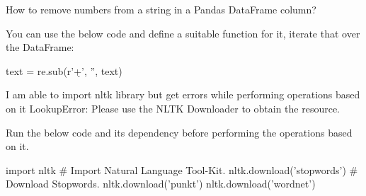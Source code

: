 	\begin{qanda}
		\begin{question}
How to remove numbers from a string in a Pandas DataFrame column?
		\end{question}
		\begin{answer}
You can use the below code and define a suitable function for it, iterate that over the DataFrame:

text = re.sub(r'\d+', '', text)
		\end{answer}
	\end{qanda}

	\begin{qanda}
		\begin{question}
I am able to import nltk library but get errors while performing operations based on it LookupError: Please use the NLTK Downloader to obtain the resource.
		\end{question}
		\begin{answer}
Run the below code and its dependency before performing the operations based on it.

			\begin{code}[\codenumbering]{}
				\codeitemnonumber import nltk \# Import Natural Language Tool-Kit.
				\codeitemnonumber nltk.download('stopwords') \# Download Stopwords.
				\codeitemnonumber nltk.download('punkt')
				\codeitemnonumber nltk.download('wordnet')
			\end{code}
		\end{answer}
	\end{qanda}

